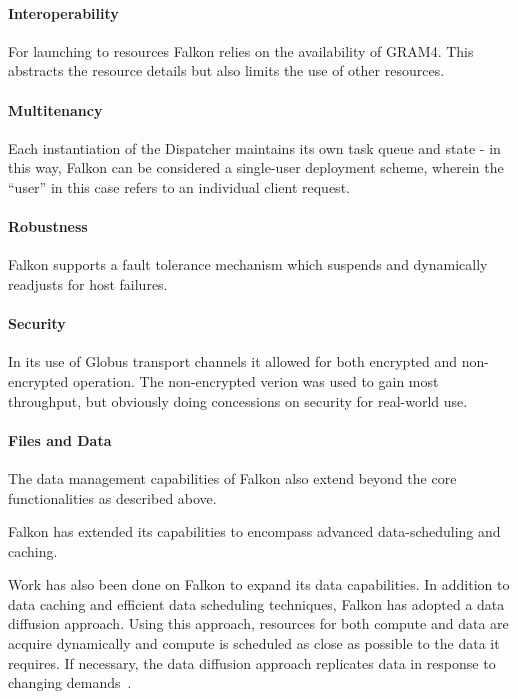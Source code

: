 \documentclass{sig-alternate}
\begin{document}
\paragraph{Interoperability}

For launching to resources Falkon relies on the availability of GRAM4.
This abstracts the resource details but also limits the use of other resources.

\paragraph{Multitenancy}

Each instantiation of the Dispatcher maintains its own task queue and state -
in this way, Falkon can be considered a single-user deployment scheme, wherein
the ``user'' in this case refers to an individual client request.

\paragraph{Robustness}

Falkon supports a fault tolerance mechanism which suspends and dynamically
readjusts for host failures.

\paragraph{Security}

In its use of Globus transport channels it allowed for both encrypted and
non-encrypted operation.
The non-encrypted verion was used to gain most throughput, but obviously doing
concessions on security for real-world use.

\paragraph{Files and Data}

The data management capabilities of Falkon also extend beyond the core
\pilotjob functionalities as described above.

Falkon has extended its capabilities
to encompass advanced data-scheduling and caching.

Work has also been done on Falkon to expand its data capabilities.
In addition to data caching and efficient data scheduling techniques, Falkon
has adopted a data diffusion approach.
Using this approach, resources for both compute and data are acquire
dynamically and compute is scheduled as close as possible to the data it
requires.
If necessary, the data diffusion approach replicates data in response to
changing demands~\cite{raicu2008accelerating}.
\end{document}
